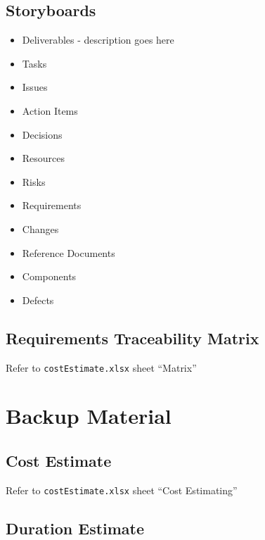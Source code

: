 \documentclass{article}
\begin{document}
\subsection{Storyboards}
\begin{itemize}
\item Deliverables - description goes here
\item Tasks
\item Issues
\item Action Items
\item Decisions
\item Resources
\item Risks
\item Requirements
\item Changes
\item Reference Documents
\item Components
\item Defects
\end{itemize}

\subsection{Requirements Traceability Matrix}
Refer to \texttt{costEstimate.xlsx} sheet ``Matrix''
\section{Backup Material}
\subsection{Cost Estimate}
Refer to \texttt{costEstimate.xlsx} sheet ``Cost Estimating''

\subsection{Duration Estimate}
\end{document}
